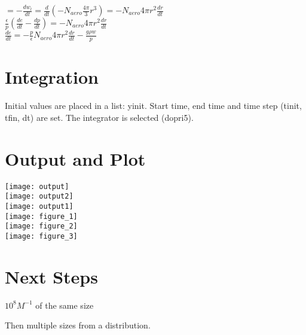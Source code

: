 \documentclass[11pt]{article} %
\begin{document}
$ = - \frac{dw_{l}}{dt} = \frac{d}{dt} \left( -N_{aero} \frac{4 \pi}{3} r^{3} \right) = -N_{aero} 4 \pi r^{2} \frac{dr}{dt}$\\

$ \frac{\epsilon}{p} \left( \frac{de}{dt} - \frac{dp}{dt}\right) = -N_{aero} 4 \pi r^{2} \frac{dr}{dt}$\\

$\frac{de}{dt} = -\frac{p}{\epsilon} N_{aero} 4 \pi r^{2} \frac{dr}{dt} - \frac{g\rho w}{p}$\\

\section{Integration}

Initial values are placed in a list: yinit.  Start time, end time and time step (tinit, tfin, dt) are set.  The integrator is selected (dopri5).

\section{Output and Plot}

\texttt{[image: output]}\\

\texttt{[image: output2]}\\

\texttt{[image: output1]}\\

\texttt{[image: figure\_1]}\\

\texttt{[image: figure\_2]}\\

\texttt{[image: figure\_3]}\\

\section{Next Steps}

$10^{8}M^{-1}$ of the same size

Then multiple sizes from a distribution.
\end{document}
